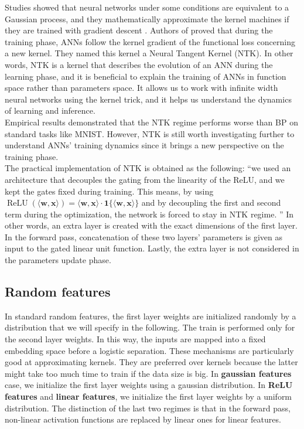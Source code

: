 \documentclass[a4paper, nobind]{templates/ociamthesis}
\begin{document}
Studies showed that neural networks under some conditions are equivalent to a Gaussian process, and they mathematically approximate the kernel machines if they are trained with gradient descent \cite{lee2018deep, domingos2020model}. Authors of \cite{DBLP:journals/corr/abs-1806-07572} proved that during the training phase, ANNs follow the kernel gradient of the functional loss concerning a new kernel. They named this kernel a Neural Tangent Kernel (NTK). In other words, NTK is a kernel that describes the evolution of an ANN during the learning phase, and it is beneficial to explain the training of ANNs in function space rather than parameters space. It allows us to work with infinite width neural networks using the kernel trick, and it helps us understand the dynamics of learning and inference.\\
Empirical results demonstrated that the NTK regime performs worse than BP on standard tasks like MNIST. However, NTK is still worth investigating further to understand ANNs' training dynamics since it brings a new perspective on the training phase.\\
The practical implementation of NTK is obtained as the following: ``we used an architecture that decouples the gating from the linearity of the ReLU, and we kept the gates fixed during training. This means, by using \(\operatorname{ReLU}(\langle\mathbf{w}, \mathbf{x}\rangle)=\langle\mathbf{w}, \mathbf{x}\rangle \cdot \mathbf{1}\{\langle\mathbf{w}, \mathbf{x}\rangle\}\) and by decoupling the first and second term during the optimization, the network is forced to stay in NTK regime. \cite{DBLP:journals/corr/abs-2002-07400}'' In other words, an extra layer is created with the exact dimensions of the first layer. In the forward pass, concatenation of these two layers' parameters is given as input to the gated linear unit function. Lastly, the extra layer is not considered in the parameters update phase.

\hypertarget{random-features}{%
\subsection{Random features}\label{random-features}}

In standard random features, the first layer weights are initialized randomly by a distribution that we will specify in the following. The train is performed only for the second layer weights. In this way, the inputs are mapped into a fixed embedding space before a logistic separation. These mechanisms are particularly good at approximating kernels. They are preferred over kernels because the latter might take too much time to train if the data size is big. In \textbf{gaussian features} case, we initialize the first layer weights using a gaussian distribution. In \textbf{ReLU features} and \textbf{linear features}, we initialize the first layer weights by a uniform distribution. The distinction of the last two regimes is that in the forward pass, non-linear activation functions are replaced by linear ones for linear features.
\end{document}
